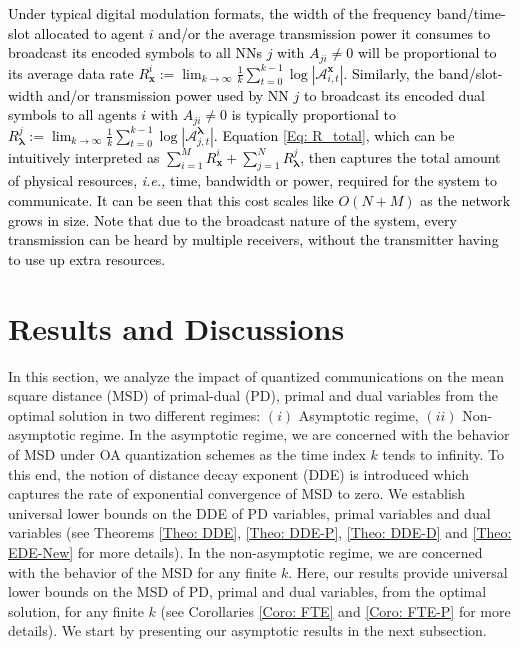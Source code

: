 \documentclass[10pt,twocolumn,twoside]{IEEEtran}
\begin{document}
\textcolor{black}{Under typical digital modulation formats, the width of the frequency band/time-slot allocated to agent $i$ and/or the average transmission power it consumes to broadcast its encoded  symbols 
to all NNs $j$ with $A_{ji}\neq 0$ will be proportional to its average data rate $R^i_{{\ensuremath{\boldsymbol{{x}}}}}:=\lim_{k\rightarrow\infty}\frac{1}{k}\sum_{t=0}^{k-1}\log{\left|{\mathcal{A}^{{\ensuremath{\boldsymbol{{x}}}}}_{i,t}}\right|}$. 
Similarly, the band/slot-width and/or transmission power used by NN $j$ to broadcast its encoded dual symbols 
to all agents $i$ with $A_{ji}\neq0$  is typically proportional to $R^j_{{\ensuremath{\boldsymbol{{\lambda}}}}}:=\lim_{k\rightarrow\infty}\frac{1}{k}\sum_{t=0}^{k-1}\log{\left|{\mathcal{A}^{{\ensuremath{\boldsymbol{{\lambda}}}}}_{j,t}}\right|}$.
Equation \eqref{Eq: R_total}, which can be intuitively interpreted as $\sum_{i=1}^M R^i_{{\ensuremath{\boldsymbol{{x}}}}}+\sum_{j=1}^NR^j_{{\ensuremath{\boldsymbol{{\lambda}}}}}$, then captures the total amount of physical resources, \emph{i.e.,} time, bandwidth or power,  required for the system to communicate. It can be seen that this cost scales like $O(N+M)$ as the network grows in size. Note that due to the broadcast nature of the system,
 every transmission can be heard by multiple receivers, without the transmitter having to use up extra resources. 
}

\section{Results and Discussions}\label{Sec: R&D}
In this section, we analyze the impact of quantized communications on the mean square distance (MSD) of primal-dual (PD), primal and dual variables from the optimal solution in two different regimes: $(i)$ Asymptotic regime, $(ii)$ Non-asymptotic regime. In the asymptotic regime, we are concerned with the behavior of MSD under OA quantization schemes as the time index $k$ tends to infinity. To this end, the notion of distance decay exponent (DDE) is introduced which captures the rate of exponential convergence of MSD to zero. 
We establish universal lower bounds on the DDE of PD variables, primal variables and dual variables (see Theorems \ref{Theo: DDE}, \ref{Theo: DDE-P}, \ref{Theo: DDE-D} and \ref{Theo: EDE-New} for more details).
In the non-asymptotic regime, we are concerned with the behavior of the MSD for any finite $k$. Here, our results provide universal lower bounds on the MSD of PD, primal and dual variables, from the optimal solution, for any finite $k$ (see Corollaries \ref{Coro: FTE} and \ref{Coro: FTE-P} for more details). We start by presenting our asymptotic results in the next subsection.
\end{document}
